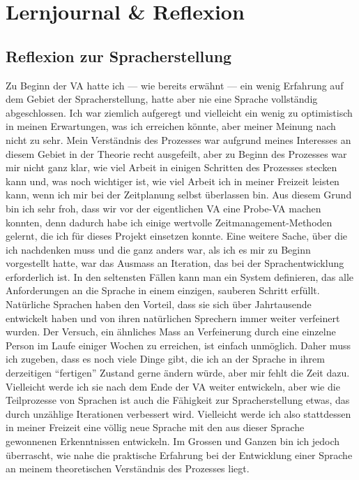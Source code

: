 \documentclass{article}
\begin{document}
\section{Lernjournal \& Reflexion}
\subsection{Reflexion zur Spracherstellung}
Zu Beginn der VA hatte ich --- wie bereits erwähnt --- ein wenig Erfahrung auf dem Gebiet der Spracherstellung,
hatte aber nie eine Sprache vollständig abgeschlossen. Ich war ziemlich aufgeregt und vielleicht ein wenig
zu optimistisch in meinen Erwartungen, was ich erreichen könnte, aber meiner Meinung nach nicht zu sehr.
Mein Verständnis des Prozesses war aufgrund meines Interesses an diesem Gebiet in der Theorie recht ausgefeilt,
aber zu Beginn des Prozesses war mir nicht ganz klar, wie viel Arbeit in einigen Schritten des Prozesses stecken
kann und, was noch wichtiger ist, wie viel Arbeit ich in meiner Freizeit leisten kann,
wenn ich mir bei der Zeitplanung selbst überlassen bin. Aus diesem Grund bin ich sehr froh,
dass wir vor der eigentlichen VA eine Probe-VA machen konnten, denn dadurch habe ich einige wertvolle
Zeitmanagement-Methoden gelernt, die ich für dieses Projekt einsetzen konnte. Eine weitere Sache,
über die ich nachdenken muss und die ganz anders war, als ich es mir zu Beginn vorgestellt hatte,
war das Ausmass an Iteration, das bei der Sprachentwicklung erforderlich ist.
In den seltensten Fällen kann man ein System definieren, das alle Anforderungen an die Sprache in einem einzigen,
sauberen Schritt erfüllt. Natürliche Sprachen haben den Vorteil, dass sie sich über Jahrtausende entwickelt
haben und von ihren natürlichen Sprechern immer weiter verfeinert wurden. Der Versuch,
ein ähnliches Mass an Verfeinerung durch eine einzelne Person im Laufe einiger Wochen zu erreichen,
ist einfach unmöglich. Daher muss ich zugeben, dass es noch viele Dinge gibt,
die ich an der Sprache in ihrem derzeitigen ``fertigen'' Zustand gerne ändern würde,
aber mir fehlt die Zeit dazu. Vielleicht werde ich sie nach dem Ende der VA weiter entwickeln,
aber wie die Teilprozesse von Sprachen ist auch die Fähigkeit zur Spracherstellung etwas,
das durch unzählige Iterationen verbessert wird. Vielleicht werde ich also stattdessen in meiner
Freizeit eine völlig neue Sprache mit den aus dieser Sprache gewonnenen Erkenntnissen entwickeln.
Im Grossen und Ganzen bin ich jedoch überrascht, wie nahe die praktische Erfahrung bei der Entwicklung
einer Sprache an meinem theoretischen Verständnis des Prozesses liegt.
\end{document}
